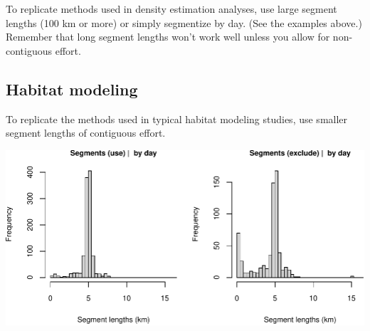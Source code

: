 \documentclass[
]{book}
\newenvironment{Shaded}{\begin{snugshade}}{\end{snugshade}}
\newcommand{\CommentTok}[1]{\textcolor[rgb]{0.56,0.35,0.01}{\textit{#1}}}
\newcommand{\DataTypeTok}[1]{\textcolor[rgb]{0.13,0.29,0.53}{#1}}
\newcommand{\DecValTok}[1]{\textcolor[rgb]{0.00,0.00,0.81}{#1}}
\newcommand{\FloatTok}[1]{\textcolor[rgb]{0.00,0.00,0.81}{#1}}
\newcommand{\KeywordTok}[1]{\textcolor[rgb]{0.13,0.29,0.53}{\textbf{#1}}}
\newcommand{\NormalTok}[1]{#1}
\newcommand{\OperatorTok}[1]{\textcolor[rgb]{0.81,0.36,0.00}{\textbf{#1}}}
\newcommand{\OtherTok}[1]{\textcolor[rgb]{0.56,0.35,0.01}{#1}}
\newcommand{\StringTok}[1]{\textcolor[rgb]{0.31,0.60,0.02}{#1}}
\begin{document}
To replicate methods used in density estimation analyses, use large segment lengths (100 km or more) or simply segmentize by day. (See the examples above.) Remember that long segment lengths won't work well unless you allow for non-contiguous effort.

\hypertarget{habitat-modeling}{%
\subsection*{Habitat modeling}\label{habitat-modeling}}

To replicate the methods used in typical habitat modeling studies, use smaller segment lengths of contiguous effort.

\begin{Shaded}
\end{Shaded}

\includegraphics{figures/unnamed-chunk-147-1.pdf}
\end{document}
